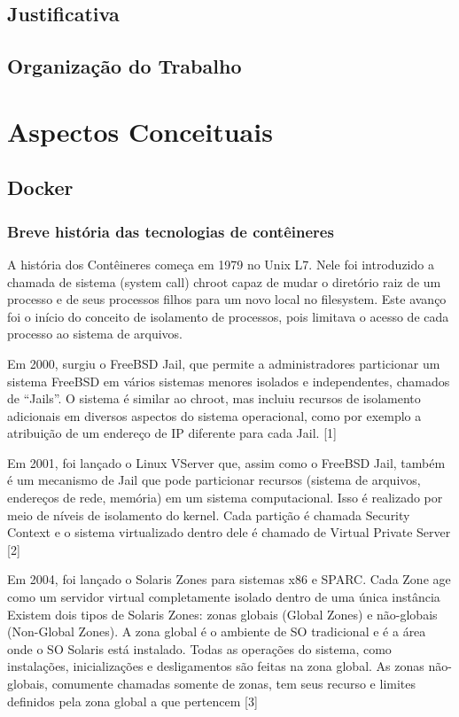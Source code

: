 \documentclass[]{politex}
\begin{document}
	\section{Justificativa}
	\section{Organização do Trabalho}
	
\chapter{Aspectos Conceituais}
	\section{Docker}
	\subsection{Breve história das tecnologias de contêineres}
	A história dos Contêineres começa em 1979 no Unix L7. Nele foi introduzido a chamada de sistema (system call) chroot capaz de mudar o diretório raiz de um processo e de seus processos filhos para um novo local no filesystem. Este avanço foi o início do conceito de isolamento de processos, pois limitava o acesso de cada processo ao sistema de arquivos. 

	Em 2000, surgiu o FreeBSD Jail, que permite a administradores particionar um sistema FreeBSD em vários sistemas menores isolados e independentes, chamados de “Jails”. O sistema é similar ao chroot, mas incluiu recursos de isolamento adicionais em diversos aspectos do sistema operacional, como por exemplo a atribuição de um endereço de IP diferente para cada Jail. [1]

	Em 2001, foi lançado o Linux VServer que, assim como o FreeBSD Jail, também é um mecanismo de Jail que pode particionar recursos (sistema de arquivos, endereços de rede, memória) em um sistema computacional. Isso é realizado por meio de níveis de isolamento do kernel. Cada partição é chamada Security Context e o sistema virtualizado dentro dele é chamado de Virtual Private Server [2]

	Em 2004, foi lançado o Solaris Zones para sistemas x86 e SPARC. Cada Zone age como um servidor virtual completamente isolado dentro de uma única instância Existem dois tipos de Solaris Zones: zonas globais (Global Zones) e não-globais (Non-Global Zones). A zona global é o ambiente de SO tradicional e é a área onde o SO Solaris está instalado. Todas as operações do sistema, como instalações, inicializações e desligamentos são feitas na zona global. As zonas não-globais, comumente chamadas somente de zonas, tem seus recurso e limites definidos pela zona global a que pertencem  [3]
\end{document}
